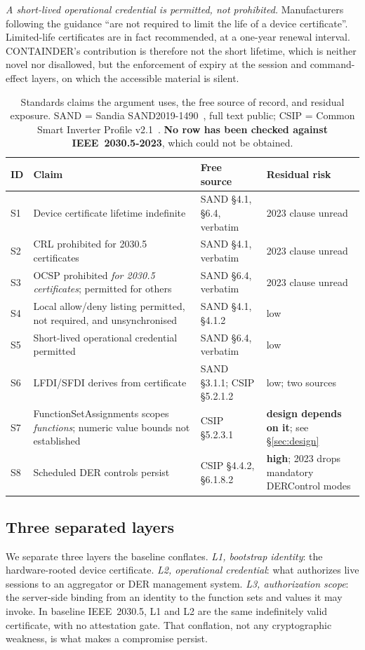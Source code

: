 \emph{A short-lived operational credential is permitted, not prohibited.} Manufacturers following
the guidance ``are not required to limit the life of a device certificate''. Limited-life
certificates are in fact recommended, at a one-year renewal interval. CONTAINDER's contribution is
therefore not the short lifetime, which is neither novel nor disallowed, but the enforcement of
expiry at the session and command-effect layers, on which the accessible material is silent.

\begin{table}[t]
\centering
\caption{Standards claims the argument uses, the free source of record, and residual exposure.
SAND = Sandia SAND2019-1490~\cite{obert2019recommendations}, full text public; CSIP = Common
Smart Inverter Profile v2.1~\cite{sunspec2018csip}. \textbf{No row has been checked against
IEEE~2030.5-2023}, which could not be obtained.}
\label{tab:standards}
\footnotesize
\begin{tabular}{@{}p{}p{}p{}p{}@{}}
\toprule
ID & Claim & Free source & Residual risk \\
\midrule
S1 & Device certificate lifetime indefinite & SAND \S4.1, \S6.4, verbatim & 2023 clause unread \\
S2 & CRL prohibited for 2030.5 certificates & SAND \S4.1, verbatim & 2023 clause unread \\
S3 & OCSP prohibited \emph{for 2030.5 certificates}; permitted for others & SAND \S6.4, verbatim &
2023 clause unread \\
S4 & Local allow/deny listing permitted, not required, and unsynchronised & SAND \S4.1, \S4.1.2 &
low \\
S5 & Short-lived operational credential permitted & SAND \S6.4, verbatim & low \\
S6 & LFDI/SFDI derives from certificate & SAND \S3.1.1; CSIP \S5.2.1.2 & low; two sources \\
S7 & FunctionSetAssignments scopes \emph{functions}; numeric value bounds not established &
CSIP \S5.2.3.1 & \textbf{design depends on it}; see \S\ref{sec:design} \\
S8 & Scheduled DER controls persist & CSIP \S4.4.2, \S6.1.8.2 & \textbf{high}; 2023 drops
mandatory DERControl modes \\
\bottomrule
\end{tabular}
\end{table}

\subsection{Three separated layers}
We separate three layers the baseline conflates. \emph{L1, bootstrap identity}: the
hardware-rooted device certificate. \emph{L2, operational credential}: what authorizes live
sessions to an aggregator or DER management system. \emph{L3, authorization scope}: the
server-side binding from an identity to the function sets and values it may invoke. In baseline
IEEE~2030.5, L1 and L2 are the same indefinitely valid certificate, with no attestation gate. That
conflation, not any cryptographic weakness, is what makes a compromise persist.


